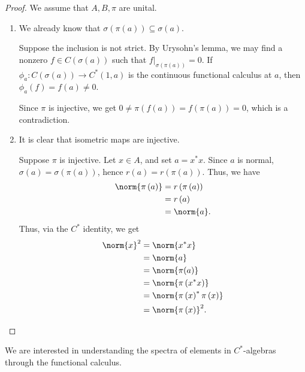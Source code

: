 \documentclass[10pt]{mypackage}
\begin{document}
\begin{proof} We assume that $A,B,\pi$ are unital.
  \begin{enumerate}[(1)]
    \item We already know that $\sigma\left(\pi\left(a\right)\right)\subseteq \sigma\left(a\right)$.\newline

      Suppose the inclusion is not strict. By Urysohn's lemma, we may find a nonzero $f\in C\left(\sigma\left(a\right)\right)$ such that $f\vert_{\sigma\left(\pi\left(a\right)\right)} = 0$. If $\phi_a\colon C\left(\sigma\left(a\right)\right)\rightarrow C^{\ast}\left(1,a\right)$ is the continuous functional calculus at $a$, then $\phi_a\left(f\right) = f(a)\neq 0$.\newline

      Since $\pi$ is injective, we get $0 \neq \pi\left(f\left(a\right)\right) = f\left(\pi\left(a\right)\right) = 0$, which is a contradiction.
    \item It is clear that isometric maps are injective.\newline

      Suppose $\pi$ is injective. Let $x\in A$, and set $a = x^{\ast}x$. Since $a$ is normal, $\sigma\left(a\right) = \sigma\left(\pi\left(a\right)\right)$, hence $r\left(a\right) = r\left(\pi\left(a\right)\right)$. Thus, we have
      \begin{align*}
        \norm{\pi\left(a\right)} &= r\left(\pi\left(a\right)\right)\\
                                 &= r\left(a\right)\\
                                 &= \norm{a}.
      \end{align*}
      Thus, via the $C^{\ast}$ identity, we get
      \begin{align*}
        \norm{x}^2 &= \norm{x^{\ast}x}\\
                   &= \norm{a}\\
                   &= \norm{\pi(a)}\\
                   &= \norm{\pi\left(x^{\ast}x\right)}\\
                   &= \norm{\pi\left(x\right)^{\ast}\pi\left(x\right)}\\
                   &= \norm{\pi\left(x\right)}^2.
      \end{align*}
  \end{enumerate}
\end{proof}
We are interested in understanding the spectra of elements in $C^{\ast}$-algebras through the functional calculus.
\end{document}
